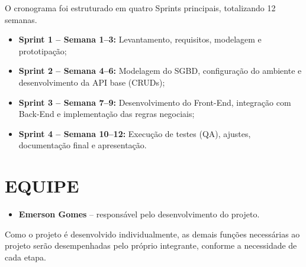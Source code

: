\documentclass[12pt,a4paper]{article}
\begin{document}
O cronograma foi estruturado em quatro Sprints principais, totalizando
12 semanas.

\begin{itemize}
    \item \textbf{Sprint 1 -- Semana 1--3:} Levantamento, requisitos,
    modelagem e prototipação;
    \item \textbf{Sprint 2 -- Semana 4--6:} Modelagem do SGBD,
    configuração do ambiente e desenvolvimento da API base (CRUDs);
    \item \textbf{Sprint 3 -- Semana 7--9:} Desenvolvimento do
    Front-End, integração com Back-End e implementação das regras
    negociais;
    \item \textbf{Sprint 4 -- Semana 10--12:} Execução de testes (QA),
    ajustes, documentação final e apresentação.
\end{itemize}


\section*{EQUIPE}

\begin{itemize}
    \item \textbf{Emerson Gomes} -- responsável pelo desenvolvimento
    do projeto.
\end{itemize}

Como o projeto é desenvolvido individualmente, as demais funções
necessárias ao projeto serão desempenhadas pelo próprio integrante,
conforme a necessidade de cada etapa.
\end{document}
